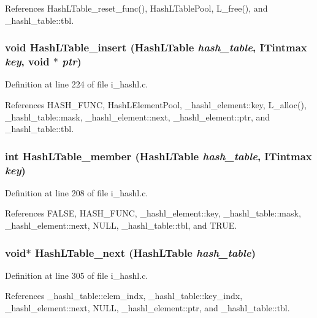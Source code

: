 References Hash\-LTable\_\-reset\_\-func(), Hash\-LTable\-Pool, L\_\-free(), and \_\-hashl\_\-table::tbl.
\subsubsection{\setlength{\rightskip}{0pt plus 5cm}void Hash\-LTable\_\-insert (\bf{Hash\-LTable} {\em hash\_\-table}, \bf{ITintmax} {\em key}, void $\ast$ {\em ptr})}\label{i__hashl_8c_be1a296810d8ee934232c8b2a9e4f413}




Definition at line 224 of file i\_\-hashl.c.

References HASH\_\-FUNC, Hash\-LElement\-Pool, \_\-hashl\_\-element::key, L\_\-alloc(), \_\-hashl\_\-table::mask, \_\-hashl\_\-element::next, \_\-hashl\_\-element::ptr, and \_\-hashl\_\-table::tbl.
\subsubsection{\setlength{\rightskip}{0pt plus 5cm}int Hash\-LTable\_\-member (\bf{Hash\-LTable} {\em hash\_\-table}, \bf{ITintmax} {\em key})}\label{i__hashl_8c_d2d8da0ea7677017ae986d4c67307cd6}




Definition at line 208 of file i\_\-hashl.c.

References FALSE, HASH\_\-FUNC, \_\-hashl\_\-element::key, \_\-hashl\_\-table::mask, \_\-hashl\_\-element::next, NULL, \_\-hashl\_\-table::tbl, and TRUE.
\subsubsection{\setlength{\rightskip}{0pt plus 5cm}void$\ast$ Hash\-LTable\_\-next (\bf{Hash\-LTable} {\em hash\_\-table})}\label{i__hashl_8c_bac3bf6b2ac8b3d49c7e0151112ff2bc}




Definition at line 305 of file i\_\-hashl.c.

References \_\-hashl\_\-table::elem\_\-indx, \_\-hashl\_\-table::key\_\-indx, \_\-hashl\_\-element::next, NULL, \_\-hashl\_\-element::ptr, and \_\-hashl\_\-table::tbl.
